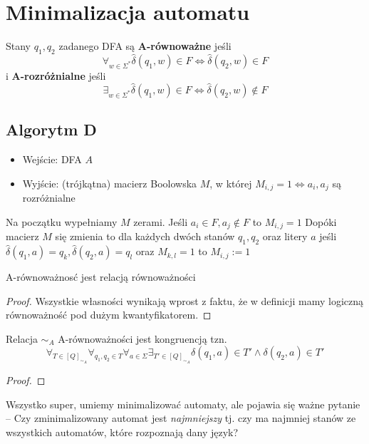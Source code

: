 \section{Minimalizacja automatu}

\begin{definition}
	Stany \( q_1, q_2 \) zadanego DFA są \textbf{A-równoważne} jeśli
	\[
		\forall_{w \in \Sigma^*} \hat \delta(q_1, w) \in F \iff \hat \delta(q_2, w) \in F
	\]
	i \textbf{A-rozróżnialne} jeśli
	\[
		\exists_{w \in \Sigma^*} \hat \delta(q_1, w) \in F \iff \hat \delta(q_2, w) \notin F
	\]
\end{definition}

\subsection{Algorytm D}
\begin{itemize}
	\item Wejście: DFA \( A \)
	\item Wyjście: (trójkątna) macierz Boolowska \( M \), w której \( M_{i, j} = 1 \iff a_i, a_j \) są rozróżnialne
\end{itemize}

Na początku wypełniamy \( M \) zerami.
Jeśli \( a_i \in F, a_j \notin F \) to \( M_{i, j} = 1 \)
Dopóki macierz \( M \) się zmienia to dla każdych dwóch stanów \( q_1, q_2 \) oraz litery \( a \) jeśli \( \hat \delta(q_1, a) = q_k, \hat \delta(q_2, a) = q_l \) oraz \( M_{k, l} = 1 \) to \( M_{i, j} := 1 \)

\begin{lemma}
	A-równoważnosć jest relacją równoważności
\end{lemma}
\begin{proof}
	Wszystkie własności wynikają wprost z faktu, że
	w definicji mamy logiczną równoważność pod dużym kwantyfikatorem.
\end{proof}

\begin{lemma}
	Relacja \(\sim_A\) A-równoważności jest kongruencją tzn.
	\[
		\forall_{T \in [Q]_{\sim_A}}
		\forall_{q_1, q_2 \in T}
		\forall_{a \in \Sigma}
		\exists_{T' \in [Q]_{\sim_A}}
		\delta(q_1, a) \in T' \land \delta(q_2, a) \in T'
	\]
\end{lemma}
\begin{proof}

\end{proof}

Wszystko super, umiemy minimalizować automaty, ale pojawia się ważne pytanie -- Czy zminimalizowany automat jest \textit{najmniejszy} tj. czy ma najmniej stanów ze wszystkich automatów, które rozpoznają dany język?

